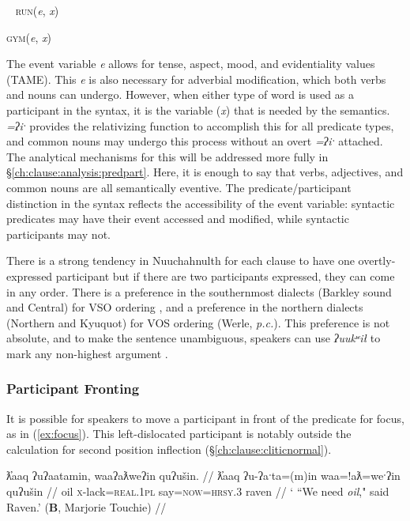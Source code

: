\ex~
\textsc{run}(\textit{e}, \textit{x})

\textsc{gym}(\textit{e}, \textit{x})
\xe

The event variable \textit{e} allows for tense, aspect, mood, and evidentiality values (TAME). This \textit{e} is also necessary for adverbial modification, which both verbs and nouns can undergo. However, when either type of word is used as a participant in the syntax, it is the variable (\textit{x}) that is needed by the semantics. \textit{=ʔiˑ} provides the relativizing function to accomplish this for all predicate types, and common nouns may undergo this process without an overt \textit{=ʔiˑ} attached. The analytical mechanisms for this will be addressed more fully in \S\ref{ch:clause:analysis:predpart}. Here, it is enough to say that verbs, adjectives, and common nouns are all semantically eventive. The predicate/participant distinction in the syntax reflects the accessibility of the event variable: syntactic predicates may have their event accessed and modified, while syntactic participants may not.


There is a strong tendency in Nuuchahnulth for each clause to have one overtly-expressed participant \citep[38]{rose1981} but if there are two participants expressed, they can come in any order. There is a preference in the southernmost dialects (Barkley sound and Central) for VSO ordering \citep[267]{jacobsen1993}, and a preference in the northern dialects (Northern and Kyuquot) for VOS ordering (Werle, \textit{p.c.}). This preference is not absolute, and to make the sentence unambiguous, speakers can use \textit{ʔuukʷił} to mark any non-highest argument \citep{woo2007b}.

\subsubsection{Participant Fronting}

It is possible for speakers to move a participant in front of the predicate for focus, as in (\ref{ex:focus}). This left-dislocated participant is notably outside the calculation for second position inflection (\S\ref{ch:clause:cliticnormal}).

\ex \label{ex:focus}
\begingl
\glpreamble ƛ̓aaq ʔuʔaatamin, waaʔaƛweʔin quʔušin. //
\gla ƛ̓aaq ʔu-ʔaˑta=(m)in waa=!aƛ=weˑʔin quʔušin //
\glb oil \textsc{x}-lack=\textsc{real.1pl} say=\textsc{now}=\textsc{hrsy.3} raven //
\glft ` ``We need \textit{oil}," said Raven.' (\textbf{B}, Marjorie Touchie) //
\endgl
\xe

